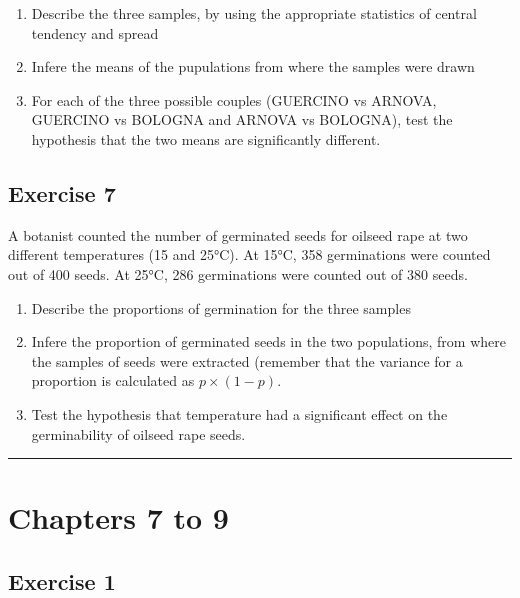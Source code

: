 \documentclass[a4paper,12pt,oneside]{book}
\providecommand{\tightlist}{%
  \setlength{\itemsep}{0pt}\setlength{\parskip}{0pt}}
\begin{document}
\begin{enumerate}
\def\labelenumi{\arabic{enumi}.}
\tightlist
\item
  Describe the three samples, by using the appropriate statistics of central tendency and spread
\item
  Infere the means of the pupulations from where the samples were drawn
\item
  For each of the three possible couples (GUERCINO vs ARNOVA, GUERCINO vs BOLOGNA and ARNOVA vs BOLOGNA), test the hypothesis that the two means are significantly different.
\end{enumerate}

\hypertarget{exercise-7}{%
\subsection{Exercise 7}\label{exercise-7}}

A botanist counted the number of germinated seeds for oilseed rape at two different temperatures (15 and 25°C). At 15°C, 358 germinations were counted out of 400 seeds. At 25°C, 286 germinations were counted out of 380 seeds.

\begin{enumerate}
\def\labelenumi{\arabic{enumi}.}
\tightlist
\item
  Describe the proportions of germination for the three samples
\item
  Infere the proportion of germinated seeds in the two populations, from where the samples of seeds were extracted (remember that the variance for a proportion is calculated as \(p \times (1- p)\).
\item
  Test the hypothesis that temperature had a significant effect on the germinability of oilseed rape seeds.
\end{enumerate}

\begin{center}\rule{0.5\linewidth}{0.5pt}\end{center}

\hypertarget{chapters-7-to-9}{%
\section{Chapters 7 to 9}\label{chapters-7-to-9}}

\hypertarget{exercise-1-4}{%
\subsection{Exercise 1}\label{exercise-1-4}}
\end{document}
